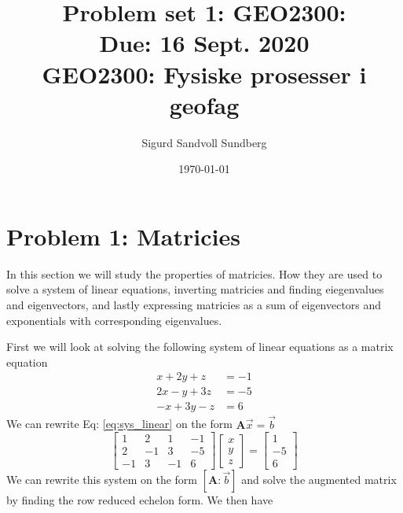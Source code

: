 \documentclass[10pt, a4paper]{amsart}
\title[Problem set 1]{Problem set 1: GEO2300: \\
\normalsize{Due: 16 Sept. 2020} \\
  \hrulefill\small{ GEO2300: Fysiske prosesser i geofag }\hrulefill}
\author[Sundberg]{Sigurd Sandvoll Sundberg}
\date{\today}
\begin{document}
\begin{titlepage}
\maketitle
\tableofcontents
\end{titlepage}

\section{Problem 1: Matricies}
In this section we will study the properties of matricies. How they are used to solve a system of linear equations, inverting matricies and finding eiegenvalues and eigenvectors, and lastly expressing matricies as a sum of eigenvectors and exponentials with corresponding eigenvalues. 

First we will look at solving the following system of linear equations as a matrix equation
\begin{equation}\label{eq:sys_linear}
\begin{split}
	x + 2y + z &= -1\\
	2x - y + 3z &= -5 \\
	-x + 3y- z &= 6
\end{split}
\end{equation}
We can rewrite Eq: \ref{eq:sys_linear} on the form $\mathbf{A}\vec{x} = \vec{b}$
\begin{equation}
	\begin{bmatrix}
		1 & 2 & 1 & -1\\
		2 & -1 & 3 & -5 \\
		-1 & 3 & -1 & 6
	\end{bmatrix}
	\begin{bmatrix}
	x\\y\\z
	\end{bmatrix}
	=
	\begin{bmatrix}
	1\\-5\\6
	\end{bmatrix}
\end{equation}
We can rewrite this system on the form $[\mathbf{A} : \vec{b}]$ and solve the augmented matrix by finding the row reduced echelon form. We then have 
\end{document}
